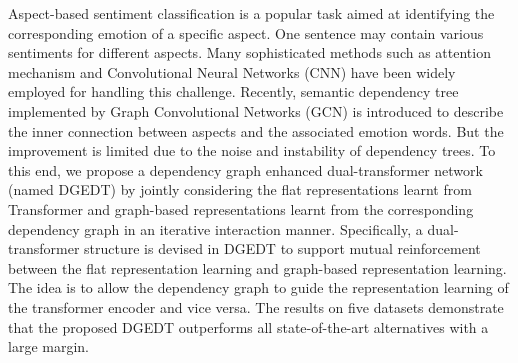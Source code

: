 Aspect-based sentiment classification is a popular task aimed at identifying the corresponding emotion of a specific aspect. One sentence may contain various sentiments for different aspects. Many sophisticated methods such as attention mechanism and Convolutional Neural Networks (CNN) have been widely employed for handling this challenge. Recently, semantic dependency tree implemented by Graph Convolutional Networks (GCN) is introduced to describe the inner connection between aspects and the associated emotion words. But the improvement is limited due to the noise and instability of dependency trees. To this end, we propose a dependency graph enhanced dual-transformer network (named DGEDT) by jointly considering the flat  representations learnt from Transformer and graph-based representations learnt from the corresponding dependency graph in an iterative interaction manner. Specifically, a dual-transformer structure is devised in DGEDT to support mutual reinforcement between the flat representation learning and graph-based representation learning. The idea is to allow the dependency graph to guide the representation learning of the transformer encoder and vice versa. The results on five datasets demonstrate that the proposed DGEDT outperforms all state-of-the-art alternatives with a large margin.
